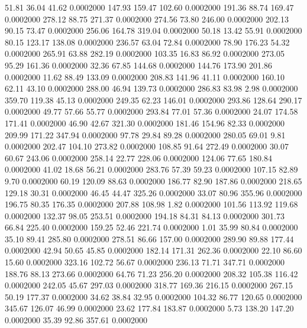   51.81   36.04   41.62   0.0002000
 147.93  159.47  102.60   0.0002000
 191.36   88.74  169.47   0.0002000
 278.12   88.75  271.37   0.0002000
 274.56   73.80  246.00   0.0002000
 202.13   90.15   73.47   0.0002000
 256.06  164.78  319.04   0.0002000
  50.18   13.42   55.91   0.0002000
  80.15  123.17  138.08   0.0002000
 236.57   63.04   72.84   0.0002000
  78.90  176.23   54.32   0.0002000
 265.91   63.88  282.19   0.0002000
 103.35   16.83   86.92   0.0002000
 273.05   95.29  161.36   0.0002000
  32.36   67.85  144.68   0.0002000
 144.76  173.90  201.86   0.0002000
  11.62   88.49  133.09   0.0002000
 208.83  141.96   41.11   0.0002000
 160.10   62.11   43.10   0.0002000
 288.00   46.94  139.73   0.0002000
 286.83   83.98    2.98   0.0002000
 359.70  119.38   45.13   0.0002000
 249.35   62.23  146.01   0.0002000
 293.86  128.64  290.17   0.0002000
  49.77   57.66   55.77   0.0002000
 293.84   77.01   57.36   0.0002000
  24.07  174.58  171.41   0.0002000
  46.90   42.67  321.30   0.0002000
 181.46  154.96   82.33   0.0002000
 209.99  171.22  347.94   0.0002000
  97.78   29.84   89.28   0.0002000
 280.05   69.01    9.81   0.0002000
 202.47  104.10  273.82   0.0002000
 108.85   91.64  272.49   0.0002000
  30.07   60.67  243.06   0.0002000
 258.14   22.77  228.06   0.0002000
 124.06   77.65  180.84   0.0002000
  41.02   18.68   56.21   0.0002000
 283.76   57.39   59.23   0.0002000
 107.15   82.89    9.70   0.0002000
  60.19  120.09   88.63   0.0002000
 186.77   82.90  187.86   0.0002000
 218.65  129.18   30.31   0.0002000
  46.45   44.47  325.26   0.0002000
  33.07   80.96  355.96   0.0002000
 196.75   80.35  176.35   0.0002000
 207.88  108.98    1.82   0.0002000
 101.56  113.92  119.68   0.0002000
 132.37   98.05  253.51   0.0002000
 194.18   84.31   84.13   0.0002000
 301.73   66.84  225.40   0.0002000
 159.25   52.46  221.74   0.0002000
   1.01   35.99   80.84   0.0002000
  35.10   89.41  285.80   0.0002000
 278.51   86.66  157.00   0.0002000
 289.90   89.88  177.44   0.0002000
  42.94   50.65   45.85   0.0002000
 182.14  171.31  262.36   0.0002000
  22.10   86.60   15.60   0.0002000
 323.16  102.72   56.67   0.0002000
 236.13   71.71  347.71   0.0002000
 188.76   88.13  273.66   0.0002000
  64.76   71.23  256.20   0.0002000
 208.32  105.38  116.42   0.0002000
 242.05   45.67  297.03   0.0002000
 318.77  169.36  216.15   0.0002000
 267.15   50.19  177.37   0.0002000
  34.62   38.84   32.95   0.0002000
 104.32   86.77  120.65   0.0002000
 345.67  126.07   46.99   0.0002000
  23.62  177.84  183.87   0.0002000
   5.73  138.20  147.20   0.0002000
  35.39   92.86  357.61   0.0002000
